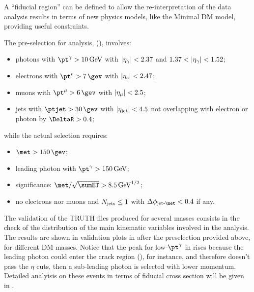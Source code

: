 A ``fiducial region'' can be defined to allow the re-interpretation of the data analysis results in terms of new physics models, like the Minimal DM model, providing useful constraints.
 
The pre-selection for \mph analysis, (\Sect{\ref{sec:SRselection}}), involves:
\begin{itemize}
\item photons with $\pt^\gamma>\SI{10}{\GeV}$ with $\lvert\eta_\gamma\rvert<2.37$ and $1.37<\lvert\eta_\gamma\rvert<1.52$;
\item electrons with $\pt^e>\SI{7}{\gev}$ with $\lvert\eta_e\rvert<2.47$;
\item muons with $\pt^\mu>\SI{6}{\gev}$ with $\lvert\eta_\mu\rvert<2.5$;
\item jets with $\ptjet>\SI{30}{\gev}$ with $\lvert\eta_{\textup{jet}}\rvert<4.5$ not overlapping with electron or photon by $\DeltaR > 0.4$;
\end{itemize}
while the actual selection requires:
\begin{itemize}
\item $\met>\SI{150}{\gev}$;
\item leading photon with $\pt^\gamma > \SI{150}{\GeV}$;
\item \met significance: $\met/\sqrt{\sumET} > \SI{8.5}{\GeV^{1/2}}$;
\item no electrons nor muons and $N_\textup{jets}\le 1$ with $\Delta\phi_\textup{jet-\met}<0.4$ if any.
\end{itemize}

The validation of the TRUTH files produced for several \chizero masses consists in the check of the distribution of the main kinematic variables involved in the analysis. The results are shown in validation plots in \Fig{\ref{fig:validation}} after the preselection provided above, for different DM masses. Notice that the peak for low-$\pt^\gamma$ in \Fig{\ref{subfig:phpt}} rises because the leading photon could enter the crack region (), for instance, and therefore doesn't pass the $\eta$ cuts, then a sub-leading photon is selected with lower momentum.
Detailed analyisis on these events in terms of fiducial cross section will be given in \Sect{\ref{sec:fid}}.

